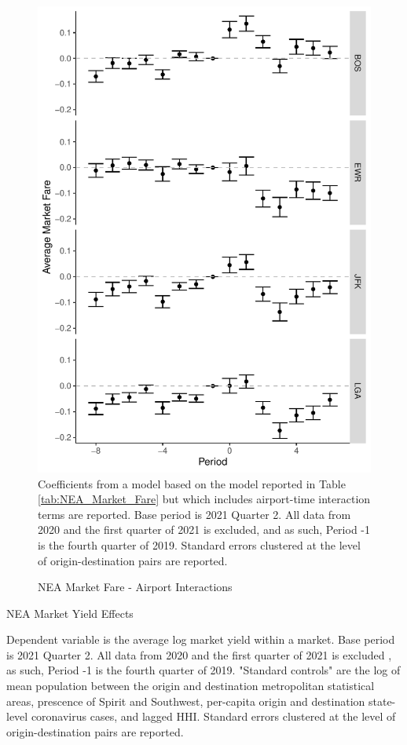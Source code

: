 \documentclass{article}
\begin{document}
\begin{appendices}
	\begin{figure}
		\caption{NEA Market Fare - Airport Interactions}
		\label{fig:NEA_Airport_Fare_Interaction}
		\includegraphics[width = \linewidth]{NEA_Airport_Fare_Graph}
		\footnotesize{Coefficients from a model based on the model reported in Table \ref{tab:NEA_Market_Fare} but which includes airport-time interaction terms are reported.   Base period is 2021 Quarter 2. All data from 2020 and the first quarter of 2021 is excluded, and as such, Period -1 is the fourth quarter of 2019. Standard errors clustered at the level of origin-destination pairs are reported. }
	\end{figure}
	
	\begin{table}
		\caption{NEA Market Yield Effects}
		\label{tab:NEA_Market_Yield}
		
		\footnotesize{Dependent variable is the average log market yield within a market. Base period is 2021 Quarter 2. All data from 2020 and the first quarter of 2021 is excluded , as such,  Period -1 is the fourth quarter of 2019. "Standard controls" are the log of mean population between the origin and destination metropolitan statistical areas, prescence of Spirit and Southwest, per-capita origin and destination state-level coronavirus cases, and lagged HHI. Standard errors clustered at the level of origin-destination pairs are reported.  }
	\end{table}
	

\end{appendices}
\end{document}
